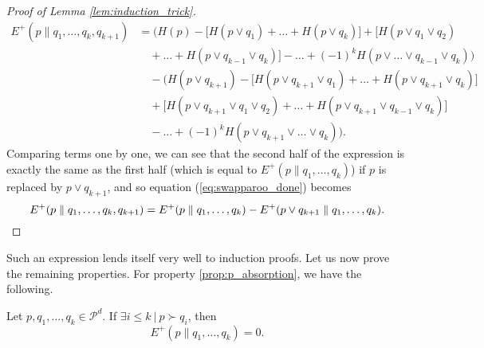 \begin{proof}[Proof of Lemma \ref{lem:induction_trick}]
    \begin{align}
        E^+(p \parallel q_1, \dots, q_k, q_{k+1}) &= \Big(H(p) - \big[H(p \vee q_1) + \dots + H(p \vee q_k)\big] + \big[H(p \vee q_1 \vee q_2)\nonumber \\
                                                  &\quad + \dots + H(p \vee q_{k-1} \vee q_k)\big] - \dots + (-1)^{k} H(p \vee \dots \vee q_{k-1} \vee q_{k})\Big) \nonumber \\
                                                  &\quad - \Big(H(p \vee q_{k+1}) - \big[H(p \vee q_{k+1} \vee q_1) + \dots + H(p \vee q_{k+1} \vee q_k)\big]\nonumber \\
                                                  &\quad + \big[H(p \vee q_{k+1} \vee q_1 \vee q_2) + \dots + H(p \vee q_{k+1} \vee q_{k-1} \vee q_k)\big]\nonumber \\
                                                  &\quad - \dots + (-1)^{k} H(p \vee q_{k+1} \vee \dots \vee q_k)\Big).  \label{eq:swapparoo_done}
    \end{align}
    Comparing terms one by one, we can see that the second half of the expression is exactly the same as the first half (which is equal to $E^+(p \parallel q_1, \dots, q_k)$) if $p$ is replaced by $p \vee q_{k+1}$, and so equation (\ref{eq:swapparoo_done}) becomes
    \begin{equation}
        E^+(p \parallel q_1, \dots, q_k, q_{k+1}) = E^+(p \parallel q_1, \dots, q_k) - E^+(p \vee q_{k+1} \parallel q_1, \dots, q_k). \qedhere
    \end{equation}
\end{proof}

Such an expression lends itself very well to induction proofs. Let us now prove the remaining properties. For property \ref{prop:p_absorption}, we have the following.

\begin{appendix_lemma}
    Let $p, q_1, \dots, q_k \in \mathcal{P}^d$. If $\exists i \leq k \: | \: p \succ q_i$, then
    \begin{equation}
        E^+(p \parallel q_1, \dots, q_k) = 0.
    \end{equation}
\end{appendix_lemma}

